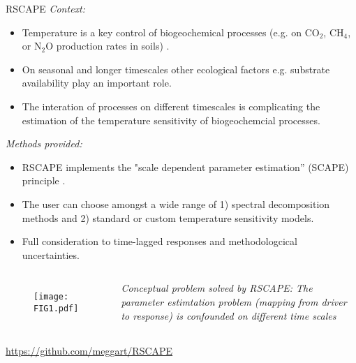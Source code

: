 \begin{block}{RSCAPE}
\alert{\textit{Context:}}
\begin{itemize}
    \item Temperature is a key control of biogeochemical processes (e.g. on CO$_2$, CH$_4$, or N$_2$O production rates in soils) .
    \item On seasonal and longer timescales other ecological factors e.g. substrate availability play an important role.
    \item The interation of processes on different timescales is complicating the estimation of the temperature sensitivity of biogeochemcial processes.
\end{itemize}
 
\alert{\textit{Methods provided:}}
\begin{itemize}
    \item RSCAPE implements the "scale dependent parameter estimation” (SCAPE) principle \citep{MAHECHAetal2010b}.
    \item The user can choose amongst a wide range of 1) spectral decomposition methods and 2) standard or custom temperature sensitivity models.
    \item Full consideration to time-lagged responses and methodologcical uncertainties.
\end{itemize}

\begin{columns}
    \begin{figure}[tb]
    \begin{center}
        \texttt{[image: FIG1.pdf]}
    \end{center}
    \end{figure}
\small{\textit{Conceptual problem solved by RSCAPE: The parameter estimtation problem (mapping from driver to response) is confounded on different time scales}}
\end{columns}
\hfill\Large{\url{https://github.com/meggart/RSCAPE}}
\end{block}